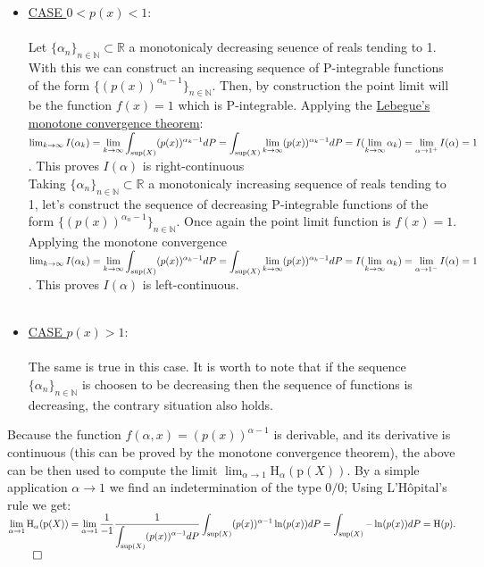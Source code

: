 \documentclass{exam}
\renewenvironment{proof}{{\noindent\itshape\ignorespaces}}{{\hfill$\qed$\\}}
\begin{document}
\begin{proof}
    \begin{itemize}
        \item \underline{CASE $0 < p(x) < 1$}:\\
        \\
        Let $\{\alpha_n\}_{n \in \mathbb{N}} \subset \mathbb{R}$ a monotonicaly decreasing seuence of reals tending to 1. With this we can construct an increasing sequence of P-integrable functions of the form $\{(p(x))^{\alpha_n -1}\}_{n \in \mathbb{N}}$. Then, by 
        construction the point limit will be the function $f(x) = 1$ which is P-integrable. Applying the \href{https://proofwiki.org/wiki/Monotone_Convergence_Theorem_(Measure_Theory)}{Lebegue's monotone convergence theorem}:\\
        $\lim_{k \to \infty} I(\alpha_k) = \displaystyle\lim_{k \to \infty} \int_{\tiny \text{sup}(X)}(p(x))^{\alpha_k-1} d P = \displaystyle\int_{\tiny \text{sup}(X)} \lim_{k \to \infty}(p(x))^{\alpha_k-1} d P  = I(\lim_{k \to \infty} \alpha_k) = \lim_{\alpha \to 1^{+}}I(\alpha) = 1$. This proves $I(\alpha)$ is right-continuous\newline
        \\
        Taking $\{\alpha_n\}_{n \in \mathbb{N}} \subset \mathbb{R}$ a monotonicaly increasing sequence of reals tending to 1, let's construct the sequence of decreasing P-integrable functions of the form $\{(p(x))^{\alpha_n -1}\}_{n \in \mathbb{N}}$. Once again the point limit function is $f(x) = 1$. Applying the monotone convergence \\
        $\lim_{k \to \infty} I(\alpha_k) = \displaystyle\lim_{k \to \infty} \int_{\tiny \text{sup}(X)}(p(x))^{\alpha_k-1} d P = \displaystyle\int_{\tiny \text{sup}(X)} \lim_{k \to \infty}(p(x))^{\alpha_k-1} d P  = I(\lim_{k \to \infty} \alpha_k) = \lim_{\alpha \to 1^{-}}I(\alpha) = 1$. This proves $I(\alpha)$ is left-continuous. \\\
        \item  \underline{CASE $p(x) > 1$}:\\
        \\
        The same is true in this case. It is worth to note that if the sequence $\{\alpha_n\}_{n \in \mathbb{N}}$ is choosen to be decreasing then the sequence of functions is decreasing, the contrary situation also holds.\\
    \end{itemize}    
    Because the function $f(\alpha,x) = (p(x))^{\alpha - 1}$ is derivable, and its derivative is continuous (this can be proved by the monotone convergence theorem), the above can be then used to compute the limit $\lim_{\alpha \to 1 }\text{H}_\alpha(\text{p}(X))$. By a simple
    application $\alpha \to 1$ we find an indetermination of the type $0/0$; Using L'Hôpital's rule we get:\\
    $\displaystyle\lim_{\alpha \to 1 }\text{H}_\alpha(\text{p}(X)) =\displaystyle\lim_{\alpha \to 1}\frac{1}{-1}\frac{1}{\displaystyle\int_{\tiny \text{sup}(X)}(p(x))^{\alpha-1} d P}\int_{\tiny \text{sup}(X)}(p(x))^{\alpha-1} \ln(p(x)) d P = \displaystyle \int_{\tiny \text{sup}(X)}-\ln(p(x)) d P = \text{H}(p).$
\end{proof}
\end{document}
